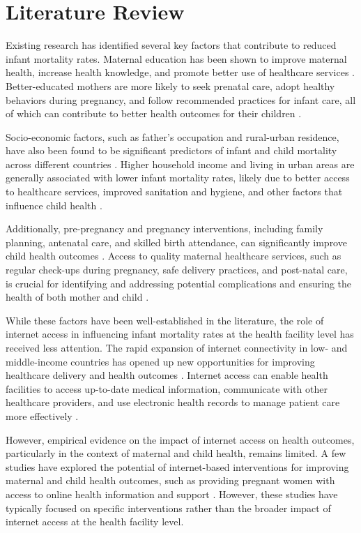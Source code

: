 \documentclass[12pt]{article}
\begin{document}
\section{Literature Review}
Existing research has identified several key factors that contribute to reduced infant mortality rates. Maternal education has been shown to improve maternal health, increase health knowledge, and promote better use of healthcare services \citep{Caldwell1979, Cleland1988}. Better-educated mothers are more likely to seek prenatal care, adopt healthy behaviors during pregnancy, and follow recommended practices for infant care, all of which can contribute to better health outcomes for their children \citep{Gakidou2010}.

Socio-economic factors, such as father's occupation and rural-urban residence, have also been found to be significant predictors of infant and child mortality across different countries \citep{Mosley1984, Hobcraft1984}. Higher household income and living in urban areas are generally associated with lower infant mortality rates, likely due to better access to healthcare services, improved sanitation and hygiene, and other factors that influence child health \citep{Gamper2012}.

Additionally, pre-pregnancy and pregnancy interventions, including family planning, antenatal care, and skilled birth attendance, can significantly improve child health outcomes \citep{Lassi2014, Akseer2015}. Access to quality maternal healthcare services, such as regular check-ups during pregnancy, safe delivery practices, and post-natal care, is crucial for identifying and addressing potential complications and ensuring the health of both mother and child \citep{Singh2014}.

While these factors have been well-established in the literature, the role of internet access in influencing infant mortality rates at the health facility level has received less attention. The rapid expansion of internet connectivity in low- and middle-income countries has opened up new opportunities for improving healthcare delivery and health outcomes \citep{Wamala2007}. Internet access can enable health facilities to access up-to-date medical information, communicate with other healthcare providers, and use electronic health records to manage patient care more effectively \citep{Lewis2012}.

However, empirical evidence on the impact of internet access on health outcomes, particularly in the context of maternal and child health, remains limited. A few studies have explored the potential of internet-based interventions for improving maternal and child health outcomes, such as providing pregnant women with access to online health information and support \citep{Lund2014, Sondaal2016}. However, these studies have typically focused on specific interventions rather than the broader impact of internet access at the health facility level.
\end{document}
